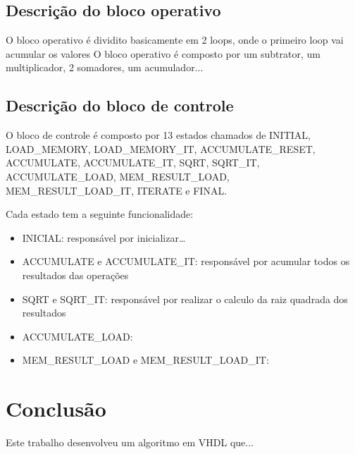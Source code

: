 \documentclass[12pt]{article}
\begin{document}
\subsection{Descrição do bloco operativo}

O bloco operativo é dividito basicamente em 2 loops, onde o primeiro loop vai acumular os valores
O bloco operativo é composto por um subtrator, um multiplicador, 2 somadores, um acumulador...



\subsection{Descrição do bloco de controle}

O bloco de controle é composto por 13 estados chamados de INITIAL, LOAD\_MEMORY, LOAD\_MEMORY\_IT, ACCUMULATE\_RESET, 
ACCUMULATE, ACCUMULATE\_IT, SQRT, SQRT\_IT, ACCUMULATE\_LOAD, MEM\_RESULT\_LOAD, MEM\_RESULT\_LOAD\_IT, ITERATE e FINAL.

Cada estado tem a seguinte funcionalidade:

\begin{itemize}

\item INICIAL: responsável por inicializar…
\item ACCUMULATE e ACCUMULATE\_IT: responsável por acumular todos os resultados das operações
\item SQRT e SQRT\_IT: responsável por realizar o calculo da raiz quadrada dos resultados
\item ACCUMULATE\_LOAD:
\item MEM\_RESULT\_LOAD e MEM\_RESULT\_LOAD\_IT:

\end{itemize}


\section{Conclus\~ao}\label{sec:figs}

Este trabalho desenvolveu um algoritmo em VHDL que...


\end{document}
